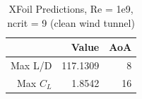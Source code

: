 \begin{table}[H]
\caption{XFoil Predictions, Re = 1e9, ncrit = 9 (clean wind tunnel)}
	\centering
	\begin{tabular}{|r|r|r|} \hline
				& Value	& AoA \\ \hline \hline
		Max L/D & 117.1309 & 8 \\ \hline
		Max $C_L$ & 1.8542 & 16 \\ \hline	
	\end{tabular}
\end{table}


